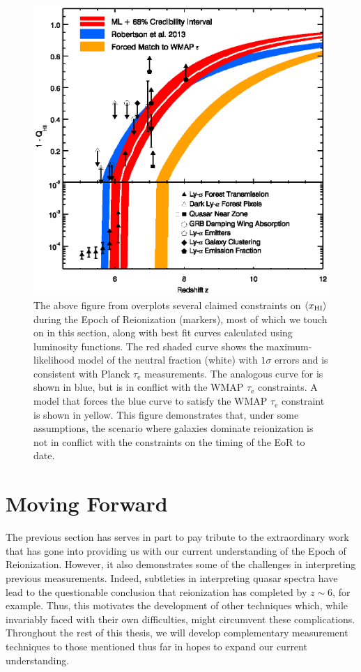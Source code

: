 \begin{figure}[!p]
  \centering
  \includegraphics[width=12cm]{Robertson2015.eps}
  \caption{The above figure from \cite{robertson2015cosmic} overplots several claimed constraints on $\langle x_{\text{HI}}\rangle$ during the Epoch of Reionization (markers), most of which we touch on in this section, along with best fit curves calculated using luminosity functions. The red shaded curve shows the maximum-likelihood model of the neutral fraction (white) with $1\sigma$ errors and is consistent with Planck $\tau_{\text{e}}$ measurements. The analogous curve for \cite{Robertson2013} is shown in blue, but is in conflict with the WMAP $\tau_{\text{e}}$ constraints. A model that forces the blue curve to satisfy the WMAP $\tau_{\text{e}}$ constraint is shown in yellow. This figure demonstrates that, under some assumptions, the scenario where galaxies dominate reionization is not in conflict with the constraints on the timing of the EoR to date.   }
  \label{fig:Robertson2015}
\end{figure}


\clearpage
\section{Moving Forward}


The previous section has serves in part to pay tribute to the extraordinary work that has gone into providing us with our current understanding of the Epoch of Reionization. However, it also demonstrates some of the challenges in interpreting previous measurements. Indeed, subtleties in interpreting quasar spectra have lead to the questionable conclusion that reionization has completed by $z \sim 6$, for example. Thus, this motivates the development of other techniques which, while invariably faced with their own difficulties, might circumvent these complications. Throughout the rest of this thesis, we will develop complementary measurement techniques to those mentioned thus far in hopes to expand our current understanding. 


